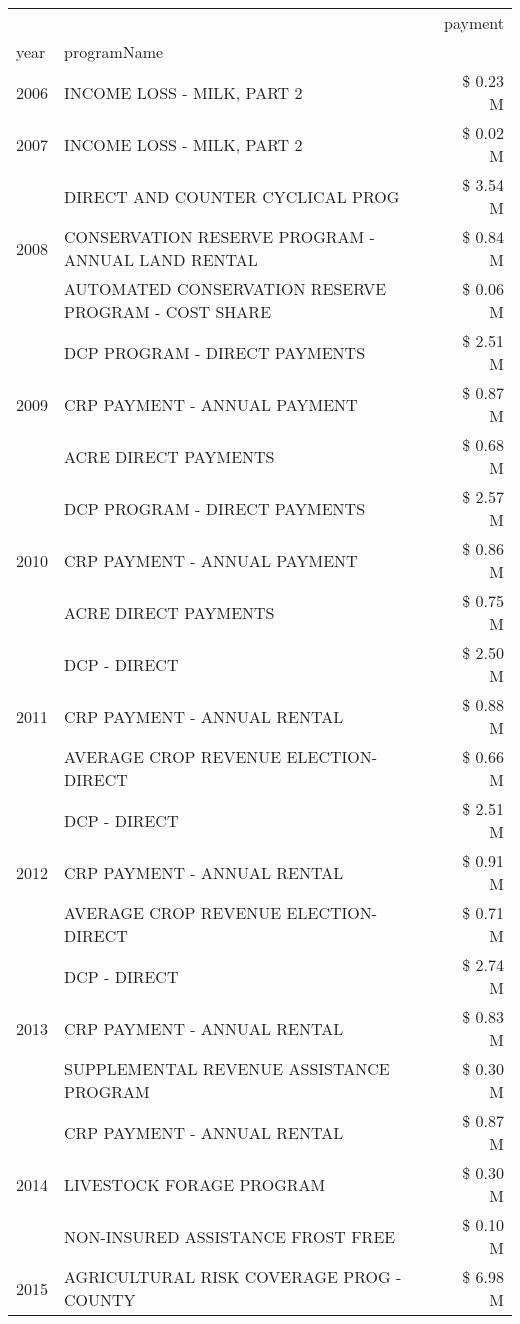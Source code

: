 \begin{tabular}{llr}
\toprule
 &  & payment \\
year & programName &  \\
\midrule
2006 & INCOME LOSS - MILK, PART 2 & \$ 0.23 M \\
\cline{1-3}
2007 & INCOME LOSS - MILK, PART 2 & \$ 0.02 M \\
\cline{1-3}
\multirow[t]{3}{*}{2008} & DIRECT AND COUNTER CYCLICAL PROG & \$ 3.54 M \\
 & CONSERVATION RESERVE PROGRAM - ANNUAL LAND RENTAL & \$ 0.84 M \\
 & AUTOMATED CONSERVATION RESERVE PROGRAM - COST SHARE & \$ 0.06 M \\
\cline{1-3}
\multirow[t]{3}{*}{2009} & DCP PROGRAM - DIRECT PAYMENTS & \$ 2.51 M \\
 & CRP PAYMENT - ANNUAL PAYMENT & \$ 0.87 M \\
 & ACRE DIRECT PAYMENTS & \$ 0.68 M \\
\cline{1-3}
\multirow[t]{3}{*}{2010} & DCP PROGRAM - DIRECT PAYMENTS & \$ 2.57 M \\
 & CRP PAYMENT - ANNUAL PAYMENT & \$ 0.86 M \\
 & ACRE DIRECT PAYMENTS & \$ 0.75 M \\
\cline{1-3}
\multirow[t]{3}{*}{2011} & DCP - DIRECT & \$ 2.50 M \\
 & CRP PAYMENT - ANNUAL RENTAL & \$ 0.88 M \\
 & AVERAGE CROP REVENUE ELECTION-DIRECT & \$ 0.66 M \\
\cline{1-3}
\multirow[t]{3}{*}{2012} & DCP - DIRECT & \$ 2.51 M \\
 & CRP PAYMENT - ANNUAL RENTAL & \$ 0.91 M \\
 & AVERAGE CROP REVENUE ELECTION-DIRECT & \$ 0.71 M \\
\cline{1-3}
\multirow[t]{3}{*}{2013} & DCP - DIRECT & \$ 2.74 M \\
 & CRP PAYMENT - ANNUAL RENTAL & \$ 0.83 M \\
 & SUPPLEMENTAL REVENUE ASSISTANCE PROGRAM & \$ 0.30 M \\
\cline{1-3}
\multirow[t]{3}{*}{2014} & CRP PAYMENT - ANNUAL RENTAL & \$ 0.87 M \\
 & LIVESTOCK FORAGE PROGRAM & \$ 0.30 M \\
 & NON-INSURED ASSISTANCE FROST FREE & \$ 0.10 M \\
\cline{1-3}
\multirow[t]{3}{*}{2015} & AGRICULTURAL RISK COVERAGE PROG - COUNTY & \$ 6.98 M \\

\end{tabular}
